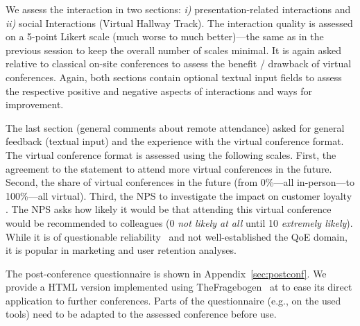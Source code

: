 \documentclass[sigconf]{acmart}
\begin{document}
We assess the interaction in two sections: \emph{i)} presentation-related interactions and \emph{ii)} social Interactions (Virtual Hallway Track).
The interaction quality is assessed on a 5-point Likert scale (much worse to much better)---the same as in the previous session to keep the overall number of scales minimal.
It is again asked relative to classical on-site conferences to assess the benefit / drawback of virtual conferences.
Again, both sections contain optional textual input fields to assess the respective positive and negative aspects of interactions and ways for improvement.

%
%
%

The last section (general comments about remote attendance) asked for general feedback (textual input) and the experience with the virtual conference format.
The virtual conference format is assessed using the following scales.
First, the agreement to the statement to attend more virtual conferences in the future.
Second, the share of virtual conferences in the future (from 0\%---all in-person---to 100\%---all virtual).
Third, the \ac{NPS} to investigate the impact on customer loyalty \cite{reichheld_one_2003}.
The \ac{NPS} asks how likely it would be that attending this virtual conference would be recommended to colleagues (0 \emph{not likely at all} until 10 \emph{extremely likely}).
While it is of questionable reliability~\cite{npscritism} and not well-established the \ac{QoE} domain, it is popular in marketing and user retention analyses.

The post-conference questionnaire is shown in Appendix~\ref{sec:postconf}.
We provide a HTML version implemented using TheFragebogen~\cite{TheFragebogen} at \cite{VirtualConferencesGithub} to ease its direct application to further conferences.
Parts of the questionnaire (e.g., on the used tools) need to be adapted to the assessed conference before use.

\balance

\clearpage


\end{document}
